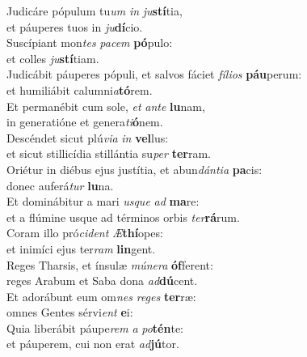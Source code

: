 \evenverse Judicáre pópulum tu\textit{um} \textit{in} \textit{ju}\textbf{stí}tia,~\*\\
\evenverse et páuperes tuos in \textit{ju}\textbf{dí}cio.\\
\oddverse Suscípiant mon\textit{tes} \textit{pa}\textit{cem} \textbf{pó}pulo:~\*\\
\oddverse et colles \textit{ju}\textbf{stí}tiam.\\
\evenverse Judicábit páuperes pópuli, et salvos fáciet \textit{fí}\textit{li}\textit{os} \textbf{páu}perum:~\*\\
\evenverse et humiliábit calumni\textit{a}\textbf{tó}rem.\\
\oddverse Et permanébit cum sole, \textit{et} \textit{an}\textit{te} \textbf{lu}nam,~\*\\
\oddverse in generatióne et genera\textit{ti}\textbf{ó}nem.\\
\evenverse Descéndet sicut plú\textit{vi}\textit{a} \textit{in} \textbf{vel}lus:~\*\\
\evenverse et sicut stillicídia stillántia su\textit{per} \textbf{ter}ram.\\
\oddverse Oriétur in diébus ejus justítia, et abun\textit{dán}\textit{ti}\textit{a} \textbf{pa}cis:~\*\\
\oddverse donec auferá\textit{tur} \textbf{lu}na.\\
\evenverse Et dominábitur a mari \textit{us}\textit{que} \textit{ad} \textbf{ma}re:~\*\\
\evenverse et a flúmine usque ad términos orbis \textit{ter}\textbf{rá}rum.\\
\oddverse Coram illo pró\textit{ci}\textit{dent} \textit{Æ}\textbf{thí}opes:~\*\\
\oddverse et inimíci ejus ter\textit{ram} \textbf{lin}gent.\\
\evenverse Reges Tharsis, et ínsulæ \textit{mú}\textit{ne}\textit{ra} \textbf{óf}ferent:~\*\\
\evenverse reges Arabum et Saba dona \textit{ad}\textbf{dú}cent.\\
\oddverse Et adorábunt eum om\textit{nes} \textit{re}\textit{ges} \textbf{ter}ræ:~\*\\
\oddverse omnes Gentes sérvi\textit{ent} \textbf{e}i:\\
\evenverse Quia liberábit páupe\textit{rem} \textit{a} \textit{po}\textbf{tén}te:~\*\\
\evenverse et páuperem, cui non erat \textit{ad}\textbf{jú}tor.\\
